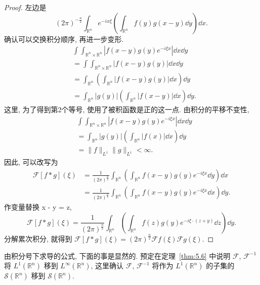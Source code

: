 \begin{proof}
左边是
\[
(2\pi)^{-\frac{n}{2}}\int_{\mathbb{R}^{n}}e^{-ix\xi}\left(\int_{\mathbb{R}^{n}}f(y)g(x-y)\dd y\right)\dd x.
\]
确认可以交换积分顺序, 再进一步变形.
\begin{align*}
&\int\int_{\mathbb{R}^{n} \times \mathbb{R}^{n}}|f(x-y)g(y)e^{-i\xi x}|\dd x\dd y \\
&= \int\int_{\mathbb{R}^{n} \times \mathbb{R}^{n}}|f(x-y)g(y)|\dd x\dd y \\
&= \int_{\mathbb{R}^{n}}\left(\int_{\mathbb{R}^{n}}|f(x-y)g(y)|\dd x\right)\dd y \\
&= \int_{\mathbb{R}^{n}}|g(y)|\left(\int_{\mathbb{R}^{n}}|f(x-y)|\dd x\right)\dd y.
\end{align*}
这里, 为了得到第2个等号, 使用了被积函数是正的这一点. 由积分的平移不变性,
\begin{align*}
&\int\int_{\mathbb{R}^{n} \times \mathbb{R}^{n}}|f(x-y)g(y)e^{-i\xi x}|\dd x\dd y \\
&= \int_{\mathbb{R}^{n}}|g(y)|\left(\int_{\mathbb{R}^{n}}|f(x)|\dd x\right)\dd y \\
&= \|f\|_{L^{1}}\|g\|_{L^{1}} < \infty.
\end{align*}
因此, 可以改写为
\begin{align*}
\mathcal{F}[f*g](\xi) &= \frac{1}{(2\pi)^{\frac{n}{2}}}\int_{\mathbb{R}^{n}}\left(\int_{\mathbb{R}^{n}}f(x-y)g(y)e^{-i\xi x}\dd y\right)\dd x \\
&= \frac{1}{(2\pi)^{\frac{n}{2}}}\int_{\mathbb{R}^{n}}\left(\int_{\mathbb{R}^{n}}f(x-y)g(y)e^{-i\xi x}\dd x\right)\dd y.
\end{align*}
作变量替换 x - y = z,
\[
\mathcal{F}[f*g](\xi) = \frac{1}{(2\pi)^{\frac{n}{2}}}\int_{\mathbb{R}^{n}}\left(\int_{\mathbb{R}^{n}}f(z)g(y)e^{-i\xi \cdot (z+y)}\dd z\right)\dd y.
\]
分解累次积分, 就得到 $\mathcal{F}[f*g](\xi) = (2\pi)^{\frac{n}{2}}\mathcal{F}f(\xi)\mathcal{F}g(\xi)$.
\end{proof}

由积分号下求导的公式, 下面的事是显然的. 预定在定理~\ref{thm:5.6} 中说明 $\mathcal{F}$, $\mathcal{F}^{-1}$ 将 $L^{1}(\mathbb{R}^{n})$ 移到 $L^{\infty}(\mathbb{R}^{n})$, 这里确认 $\mathcal{F}$, $\mathcal{F}^{-1}$ 将作为 $L^{1}(\mathbb{R}^{n})$ 的子集的 $\mathcal{S}(\mathbb{R}^{n})$ 移到 $\mathcal{S}(\mathbb{R}^{n})$.


